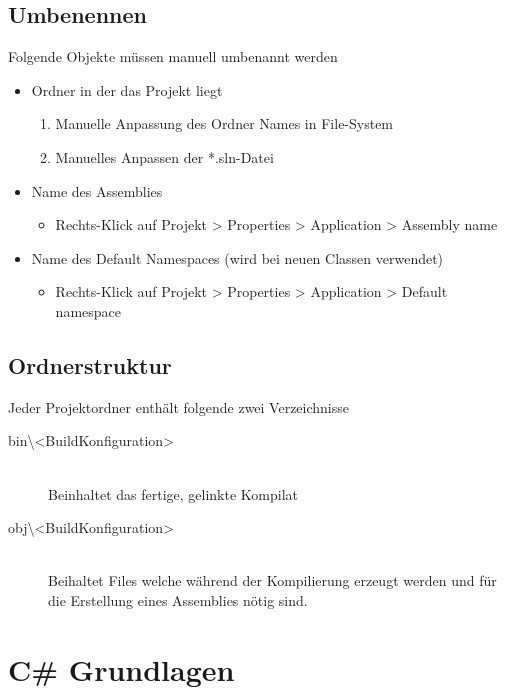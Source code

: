 \documentclass[
a4paper,
oneside,
10pt,
fleqn,
headsepline,
toc=listofnumbered, 
bibliography=totocnumbered]{scrartcl}
\let\stdsection\section
\renewcommand\section{\clearpage\stdsection}
\begin{document}
\subsection{Umbenennen}
Folgende Objekte müssen manuell umbenannt werden
\begin{itemize}
	\item Ordner in der das Projekt liegt 
	\begin{enumerate}
		\item Manuelle Anpassung des Ordner Names in File-System
		\item  Manuelles Anpassen der *.sln-Datei
	\end{enumerate}
	\item Name des Assemblies
	\begin{itemize}
		\item Rechts-Klick auf Projekt > Properties > Application > Assembly name
	\end{itemize}
	\item Name des Default Namespaces (wird bei neuen Classen verwendet)
	\begin{itemize}
		\item Rechts-Klick auf Projekt > Properties > Application > Default namespace
	\end{itemize}
\end{itemize}

\subsection{Ordnerstruktur}
Jeder Projektordner enthält folgende zwei Verzeichnisse
\begin{description}
	\item[bin\textbackslash<BuildKonfiguration>] \hfill \\
	Beinhaltet das fertige, gelinkte Kompilat
	\item[obj\textbackslash<BuildKonfiguration>] \hfill \\
	Beihaltet Files welche während der Kompilierung erzeugt werden und für die Erstellung eines Assemblies nötig sind.
\end{description}


\section{C\# Grundlagen}
\end{document}
